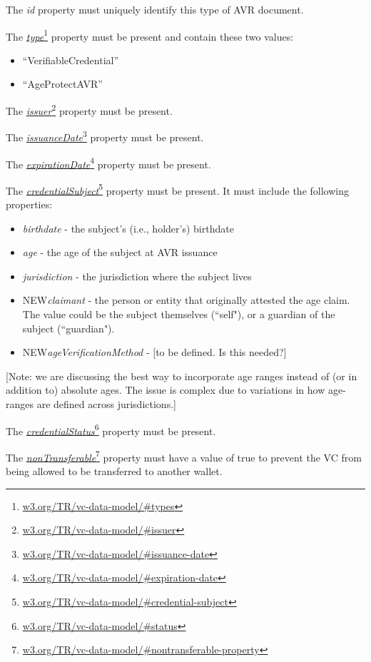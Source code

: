 \documentclass[11pt, oneside]{article}   	%
\newcommand{\hyperfootnote}[1][]{\def\ArgI{{#1}}\hyperfootnoteRelay}
\newcommand\hyperfootnoteRelay[2][]{\href{#1#2}{\ArgI}\footnote{\href{#1#2}{#2}}}
\begin{document}
The \emph{id} property must uniquely identify this type of AVR document.
	
The \hyperfootnote[\emph{type}][https://]{w3.org/TR/vc-data-model/\#types} property must be present and contain these two values:
\begin{itemize}
	\item ``VerifiableCredential''
	\item ``AgeProtectAVR''
\end{itemize}

The \hyperfootnote[\emph{issuer}][https://]{w3.org/TR/vc-data-model/\#issuer} property must be present.

The \hyperfootnote[\emph{issuanceDate}][https://]{w3.org/TR/vc-data-model/\#issuance-date} property must be present.

The \hyperfootnote[\emph{expirationDate}][https://]{w3.org/TR/vc-data-model/\#expiration-date} property must be present.

The \hyperfootnote[\emph{credentialSubject}][https://]{w3.org/TR/vc-data-model/\#credential-subject} property must be present. It must include the following properties:
\begin{itemize}
	\item \emph{birthdate} - the subject's (i.e., holder's) birthdate
	\item \emph{age} - the age of the subject at AVR issuance
	\item \emph{jurisdiction} - the jurisdiction where the subject lives
	\item \colorbox{BurntOrange}{NEW}\emph{claimant} - the person or entity that originally attested the age claim. The value could be the subject themselves (``self"), or a guardian of the subject (``guardian").
	\item \colorbox{BurntOrange}{NEW}\emph{ageVerificationMethod} - [to be defined. Is this needed?]
\end{itemize}

[Note: we are discussing the best way to incorporate age ranges instead of (or in addition to) absolute ages. The issue is complex due to variations in how age-ranges are defined across jurisdictions.]

The \hyperfootnote[\emph{credentialStatus}][https://]{w3.org/TR/vc-data-model/\#status} property must be present.

The \hyperfootnote[\emph{nonTransferable}][https://]{w3.org/TR/vc-data-model/\#nontransferable-property} property must have a value of true to prevent the VC from being allowed to be transferred to another wallet.
\end{document}
